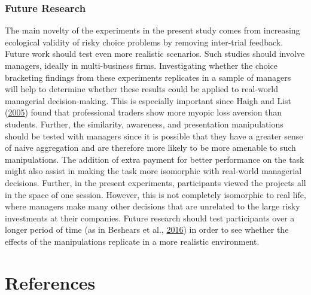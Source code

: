 \documentclass[
  english,
  man, donotrepeattitle,floatsintext]{apa7}
\theoremstyle{definition}
\theoremstyle{definition}
\theoremstyle{definition}
\theoremstyle{definition}
\theoremstyle{remark}
\begin{document}
\hypertarget{future-research}{%
\subsubsection{Future Research}\label{future-research}}

The main novelty of the experiments in the present study comes from increasing
ecological validity of risky choice problems by removing inter-trial feedback.
Future work should test even more realistic scenarios. Such studies should
involve managers, ideally in multi-business firms. Investigating whether the
choice bracketing findings from these experiments replicates in a sample of
managers will help to determine whether these results could be applied to
real-world managerial decision-making. This is especially important since
Haigh and List (\protect\hyperlink{ref-haigh2005}{2005}) found that professional traders show more myopic loss aversion than
students. Further, the similarity, awareness, and presentation manipulations
should be tested with managers since it is possible that they have a greater
sense of naive aggregation and are therefore more likely to be more amenable to
such manipulations. The addition of extra payment for better performance on the
task might also assist in making the task more isomorphic with real-world
managerial decisions. Further, in the present experiments, participants viewed
the projects all in the space of one session. However, this is not completely
isomorphic to real life, where managers make many other decisions that are
unrelated to the large risky investments at their companies. Future research
should test participants over a longer period of time (as in Beshears et al., \protect\hyperlink{ref-beshears2016}{2016}) in
order to see whether the effects of the manipulations replicate in a more
realistic environment.

\newpage

\newpage

\hypertarget{references}{%
\section{References}\label{references}}

\begingroup
\setlength{\parindent}{-0.5in}
\setlength{\leftskip}{0.5in}
\end{document}
